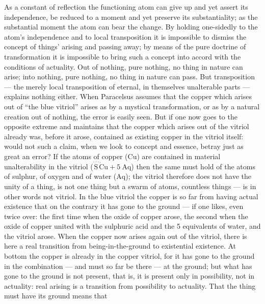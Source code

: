 \documentclass[12pt,a4paper]{book}
\begin{document}
As a constant of reflection the functioning atom can give up and yet assert its
independence, be reduced to a moment and yet preserve its substantiality; as
the substantial moment the atom can bear the change. By holding one-sidedly to
the atom's independence and to local transposition it is impossible to dismiss
the concept of things' arising and passing away; by means of the pure doctrine
of transformation it is impossible to bring such a concept into accord with the
conditions of actuality. Out of nothing, pure nothing, no thing in nature can
arise; into nothing, pure nothing, no thing in nature can pass. But
transposition --- the merely local transposition of eternal, in themselves
unalterable parts --- explains nothing either. When Paracelsus assumes that the
copper which arises out of ``the blue vitriol'' arises as by a mystical
transformation, or as by a natural creation out of nothing, the error is easily
seen. But if one now goes to the opposite extreme and maintains that the copper
which arises out of the vitriol already was, before it arose, contained as
existing copper in the vitriol itself: would not such a claim, when we look to
concept and essence,
betray just as great an error? If the atoms of copper ($\mathrm{Cu}$) are
contained in material unalterability in the vitriol
($\stackrel{\cdot\cdot\cdot}{\mathrm{S}}\dot{\mathrm{C}}\mathrm{u}
+ 5\ \mathrm{Aq}$) then the same must hold of the atoms of sulphur,
of oxygen and of water ($\mathrm{Aq}$); the vitriol therefore does not have the
unity of a thing, is not one thing but a swarm of atoms, countless things --- is
in other words not vitriol. In the blue vitriol the copper is so far from
having actual existence that on the contrary it has gone to the ground --- if
one likes, even twice over: the first time when the oxide of copper arose, the
second when the oxide of copper united with the sulphuric acid and the 5
equivalents of water, and the vitriol arose. When the copper now arises again
out of the vitriol, there is here a real transition from being-in-the-ground to
existential existence. At bottom the copper is already in the copper vitriol,
for it has gone to the ground in the combination --- and must so far be there
--- at the ground; but what has gone to the ground is not present, that is, it
is present only in possibility, not in actuality: real arising is a transition
from possibility to actuality. That the thing must have its ground means that
\end{document}
